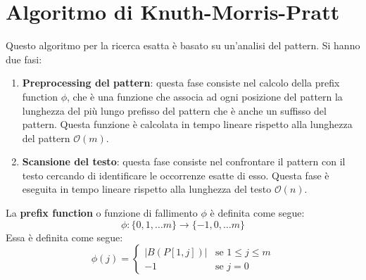 \section{Algoritmo di Knuth-Morris-Pratt}
Questo algoritmo per la ricerca esatta è basato su un'analisi del pattern. Si hanno due fasi:
\begin{enumerate}
    \item \textbf{Preprocessing del pattern}: questa fase consiste nel calcolo
          della prefix function $\phi$, che è una funzione che associa ad ogni posizione
          del pattern la lunghezza del più lungo prefisso del pattern che è anche un
          suffisso del pattern. Questa funzione è calcolata in tempo lineare rispetto
          alla lunghezza del pattern $\mathcal{O}(m)$.
    \item \textbf{Scansione del testo}: questa fase consiste nel confrontare il
          pattern con il testo cercando di identificare le occorrenze esatte di esso.
          Questa fase è eseguita in tempo lineare rispetto alla lunghezza del testo $\mathcal{O}(n)$.
\end{enumerate}
La \textbf{prefix function} o funzione di fallimento $\phi$ è definita come segue:
\begin{equation}
    \phi: \{0, 1, \dots m\} \to \{-1, 0, \dots m\}
\end{equation}
Essa è definita come segue:
\begin{equation}
    \phi(j) = \begin{cases} |B(P[1, j])| & \text{se } 1 \leq j \leq m \\-1 & \text{se } j = 0 \end{cases}
\end{equation}
